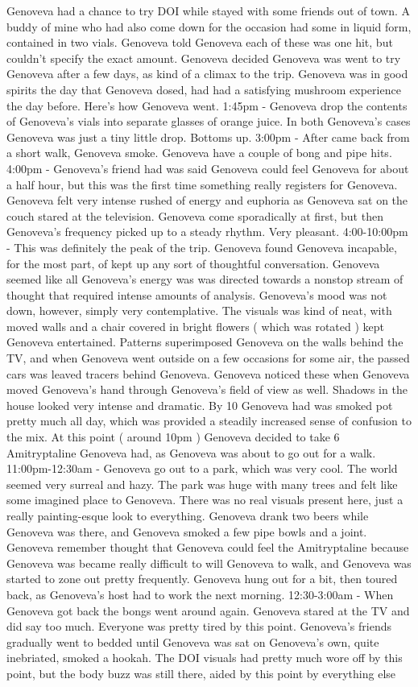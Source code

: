 \documentclass[12pt]{book}
\begin{document}
Genoveva had a chance to try DOI while stayed with some friends out of town. A buddy of mine who had also come down for the occasion had some in liquid form, contained in two vials. Genoveva told Genoveva each of these was one hit, but couldn't specify the exact amount. Genoveva decided Genoveva was went to try Genoveva after a few days, as kind of a climax to the trip. Genoveva was in good spirits the day that Genoveva dosed, had had a satisfying mushroom experience the day before. Here's how Genoveva went. 1:45pm - Genoveva drop the contents of Genoveva's vials into separate glasses of orange juice. In both Genoveva's cases Genoveva was just a tiny little drop. Bottoms up. 3:00pm - After came back from a short walk, Genoveva smoke. Genoveva have a couple of bong and pipe hits. 4:00pm - Genoveva's friend had was said Genoveva could feel Genoveva for about a half hour, but this was the first time something really registers for Genoveva. Genoveva felt very intense rushed of energy and euphoria as Genoveva sat on the couch stared at the television. Genoveva come sporadically at first, but then Genoveva's frequency picked up to a steady rhythm. Very pleasant. 4:00-10:00pm - This was definitely the peak of the trip. Genoveva found Genoveva incapable, for the most part, of kept up any sort of thoughtful conversation. Genoveva seemed like all Genoveva's energy was was directed towards a nonstop stream of thought that required intense amounts of analysis. Genoveva's mood was not down, however, simply very contemplative. The visuals was kind of neat, with moved walls and a chair covered in bright flowers ( which was rotated ) kept Genoveva entertained. Patterns superimposed Genoveva on the walls behind the TV, and when Genoveva went outside on a few occasions for some air, the passed cars was leaved tracers behind Genoveva. Genoveva noticed these when Genoveva moved Genoveva's hand through Genoveva's field of view as well. Shadows in the house looked very intense and dramatic. By 10 Genoveva had was smoked pot pretty much all day, which was provided a steadily increased sense of confusion to the mix. At this point ( around 10pm ) Genoveva decided to take 6 Amitryptaline Genoveva had, as Genoveva was about to go out for a walk. 11:00pm-12:30am - Genoveva go out to a park, which was very cool. The world seemed very surreal and hazy. The park was huge with many trees and felt like some imagined place to Genoveva. There was no real visuals present here, just a really painting-esque look to everything. Genoveva drank two beers while Genoveva was there, and Genoveva smoked a few pipe bowls and a joint. Genoveva remember thought that Genoveva could feel the Amitryptaline because Genoveva was became really difficult to will Genoveva to walk, and Genoveva was started to zone out pretty frequently. Genoveva hung out for a bit, then toured back, as Genoveva's host had to work the next morning. 12:30-3:00am - When Genoveva got back the bongs went around again. Genoveva stared at the TV and did say too much. Everyone was pretty tired by this point. Genoveva's friends gradually went to bedded until Genoveva was sat on Genoveva's own, quite inebriated, smoked a hookah. The DOI visuals had pretty much wore off by this point, but the body buzz was still there, aided by this point by everything else 
\end{document}
